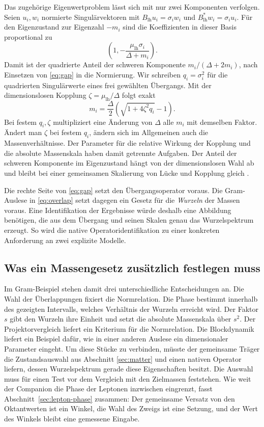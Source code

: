 Das zugehörige Eigenwertproblem lässt sich mit nur zwei
Komponenten verfolgen. Seien \(u_i,w_i\) normierte
Singulärvektoren mit \(B_{\mathrm{lh}}u_i=\sigma_iw_i\)
und \(B_{\mathrm{lh}}^*w_i=\sigma_iu_i\). Für den Eigenzustand
zur Eigenzahl \(-m_i\) sind die Koeffizienten in dieser Basis
proportional zu
\[
 \left(1,-\frac{\mu_{\mathrm{lh}}\sigma_i}{\Delta+m_i}\right).
\]
Damit ist der quadrierte Anteil der schweren Komponente
\(m_i/(\Delta+2m_i)\), nach Einsetzen von \eqref{eq:gap}
in die Normierung. Wir schreiben \(q_i=\sigma_i^2\) für die
quadrierten Singulärwerte eines frei gewählten Übergangs. Mit der dimensionslosen Kopplung
\(\zeta=\mu_{\mathrm{lh}}/\Delta\) folgt exakt
\begin{equation}
 m_i=\frac{\Delta}{2}\left(\sqrt{1+4\zeta^2q_i}-1\right).
 \label{eq:koide-scale-gap}
\end{equation}
Bei festem \(q_i,\zeta\) multipliziert eine Änderung von
\(\Delta\) alle \(m_i\) mit demselben Faktor. Ändert man
\(\zeta\) bei festem \(q_i\), ändern sich im Allgemeinen auch
die Massenverhältnisse. Der Parameter für
die relative Wirkung der Kopplung und die absolute
Massenskala haben damit getrennte Aufgaben. Der Anteil
der schweren Komponente im Eigenzustand hängt von der
dimensionslosen Wahl ab und bleibt bei einer gemeinsamen
Skalierung von Lücke und Kopplung gleich
\cite{companion,repo}.

Die rechte Seite von \eqref{eq:gap} setzt den Übergangsoperator voraus. Die Gram-Auslese in \eqref{eq:overlap} setzt dagegen ein Gesetz für die \emph{Wurzeln} der Massen voraus. Eine Identifikation der Ergebnisse würde deshalb eine Abbildung benötigen, die aus dem Übergang und seinen Skalen genau das Wurzelspektrum erzeugt. So wird die native Operatoridentifikation zu einer konkreten Anforderung an zwei explizite Modelle.

\subsection{Was ein Massengesetz zusätzlich festlegen muss}

Im Gram-Beispiel stehen damit drei unterschiedliche Entscheidungen
an. Die Wahl der Überlappungen fixiert die Normrelation. Die Phase
bestimmt innerhalb des gezeigten Intervalls, welches Verhältnis
der Wurzeln erreicht wird. Der Faktor \(s\) gibt den Wurzeln ihre
Einheit und setzt die absolute Massenskala über \(s^2\). Der
Projektorvergleich liefert ein Kriterium für die Normrelation.
Die Blockdynamik liefert ein Beispiel dafür, wie in einer
anderen Auslese ein dimensionaler Parameter eingeht. Um diese
Stücke zu verbinden, müsste der gemeinsame Träger die
Zustandsauswahl aus Abschnitt \ref{sec:matter} und einen
nativen Operator liefern, dessen Wurzelspektrum gerade diese
Eigenschaften besitzt. Die Auswahl muss für einen Test vor dem
Vergleich mit den Zielmassen feststehen.
Wie weit der Companion die Phase der Leptonen inzwischen
eingrenzt, fasst Abschnitt~\ref{sec:lepton-phase} zusammen:
Der gemeinsame Versatz von den Oktantwerten ist ein Winkel, die
Wahl des Zweigs ist eine Setzung, und der Wert des Winkels bleibt
eine gemessene Eingabe.

